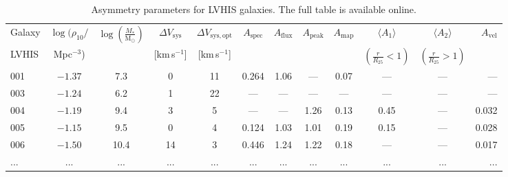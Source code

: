 \documentclass[fleqn,usenatbib]{mnras}
\begin{document}
\begin{table}
	\centering
    \caption{Asymmetry parameters for LVHIS galaxies. The full table is available online.}
	\label{table:param_lvhis}
	\begin{tabular}{lccccccccccr}
	    \\ \hline
        Galaxy & $\log(\rho_{10}/$ & $\log\left(\frac{M_*}{\mathrm{M}_{\mathrm{\odot}}}\right)$ & $\Delta V_{\mathrm{sys}}$ & $\Delta V_{\mathrm{sys,opt}}$ & $A_{\mathrm{spec}}$ & $A_{\mathrm{flux}}$ & $A_{\mathrm{peak}}$ & $A_{\mathrm{map}}$ & $\langle A_{1}\rangle$ & $\langle A_{2}\rangle$ & $A_{\mathrm{vel}}$ \\
        LVHIS & Mpc$^{-3}$) & & [km\,s$^{-1}$] & [km\,s$^{-1}$] & & & & & $\left(\frac{r}{R_{25}}<1\right)$ & $\left(\frac{r}{R_{25}}>1\right)$ & \\ \hline
        001 & $-1.37$ & 7.3 & 0 & 11 & 0.264 & 1.06 & --- & 0.07 & --- & --- & --- \\ 
        003 & $-1.24$ & 6.2 & 1 & 22 & --- & --- & --- & --- & --- &    --- & --- \\ 
        004 & $-1.19$ & 9.4 & 3 & 5 & --- & --- & 1.26 & 0.13 & 0.45 & --- & 0.032 \\ 
        005 & $-1.15$ & 9.5 & 0 & 4 & 0.124 & 1.03 & 1.01 & 0.19 & 0.15 & --- & 0.028 \\ 
        006 & $-1.50$ & 10.4 & 14 & 3 & 0.446 & 1.24 & 1.22 & 0.18 & --- & --- & 0.017 \\ 
        ... & ... & ... & ... & ... & ... & ... & ... & ... & ... & ... & ... \\ \hline
	\end{tabular}
\end{table}
\end{document}
